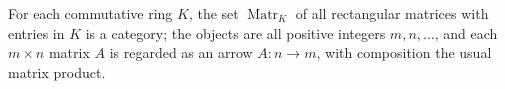 For each commutative ring $K$, the set $\operatorname{Matr}_K$ of all rectangular matrices with entries in $K$ is a category; the objects are all positive integers $m, n, \ldots$, and each $m \times n$ matrix $A$ is regarded as an arrow $A : n \to m$, with composition the usual matrix product.
